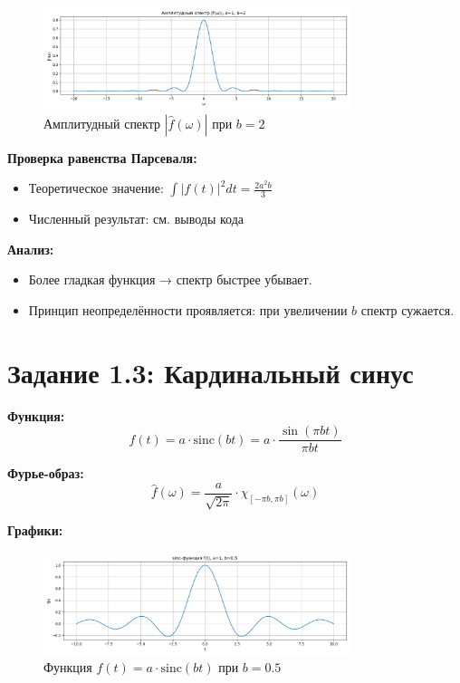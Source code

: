 \begin{figure}[H]
    \centering
    \includegraphics[width=0.8\textwidth]{triangle_spectrum_b2.png}
    \caption{Амплитудный спектр $|\hat{f}(\omega)|$ при $b = 2$}
\end{figure}

\textbf{Проверка равенства Парсеваля:}

\begin{itemize}
    \item Теоретическое значение: $\displaystyle \int |f(t)|^2 dt = \frac{2 a^2 b}{3}$
    \item Численный результат: см. выводы кода
\end{itemize}

\textbf{Анализ:}

\begin{itemize}
    \item Более гладкая функция → спектр быстрее убывает.
    \item Принцип неопределённости проявляется: при увеличении $b$ спектр сужается.
\end{itemize}

\section*{Задание 1.3: Кардинальный синус}

\textbf{Функция:}
\[
f(t) = a \cdot \mathrm{sinc}(bt) = a \cdot \frac{\sin(\pi b t)}{\pi b t}
\]

\textbf{Фурье-образ:}
\[
\hat{f}(\omega) = \frac{a}{\sqrt{2\pi}} \cdot \chi_{[-\pi b, \pi b]}(\omega)
\]

\textbf{Графики:}

\begin{figure}[H]
    \centering
    \includegraphics[width=0.8\textwidth]{sinc_function_b0.5.png}
    \caption{Функция $f(t) = a \cdot \mathrm{sinc}(bt)$ при $b = 0.5$}
\end{figure}

